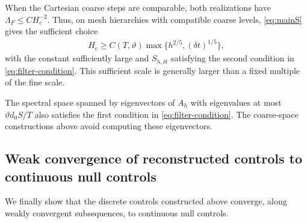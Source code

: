 \documentclass[print,wide,eng]{draft}
\begin{document}
When the Cartesian coarse steps are comparable, both realizations have $\Lambda_F\leq C H_c^{-2}$. Thus, on mesh hierarchies with compatible coarse levels, \cref{eq:mainS} gives the sufficient choice
%
\begin{align}\label{eq:filter-coarse-scale}
H_c\geq C(T,\vartheta)\max\{h^{2/5},(\delta t)^{1/5}\},
\end{align}
%
with the constant sufficiently large and $S_{h,\delta t}$ satisfying the second condition in \cref{eq:filter-condition}. This sufficient scale is generally larger than a fixed multiple of the fine scale.
%
\begin{remark}
The spectral space spanned by eigenvectors of $A_h$ with eigenvalues at most $\vartheta d_0S/T$ also satisfies the first condition in \cref{eq:filter-condition}. The coarse-space constructions above avoid computing these eigenvectors.
\end{remark}
%

\subsection{Weak convergence of reconstructed controls to continuous null controls}\label{sec:control-convergence}

We finally show that the discrete controls constructed above converge, along weakly convergent subsequences, to continuous null controls.
\end{document}
